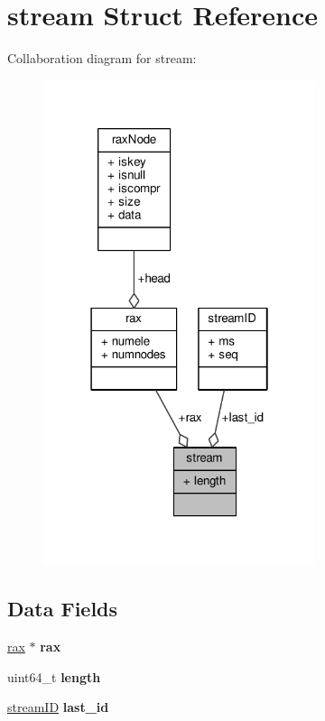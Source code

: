 \hypertarget{structstream}{}\section{stream Struct Reference}
\label{structstream}


Collaboration diagram for stream\+:\nopagebreak
\begin{figure}[H]
\begin{center}
\leavevmode
\includegraphics[width=226pt]{structstream__coll__graph}
\end{center}
\end{figure}
\subsection*{Data Fields}
\begin{DoxyCompactItemize}
\item 
\mbox{\label{structstream_aaf9d3feea819c3fedf264ec02da0202e}} 
\hyperlink{structrax}{rax} $\ast$ {\bfseries rax}
\item 
\mbox{\label{structstream_ace249bebbe9bb1afb985d6a6ff5b3e1a}} 
uint64\+\_\+t {\bfseries length}
\item 
\mbox{\label{structstream_adc5d2c6bce4a80d96ff17b80fcd180fb}} 
\hyperlink{structstreamID}{stream\+ID} {\bfseries last\+\_\+id}
\end{DoxyCompactItemize}


